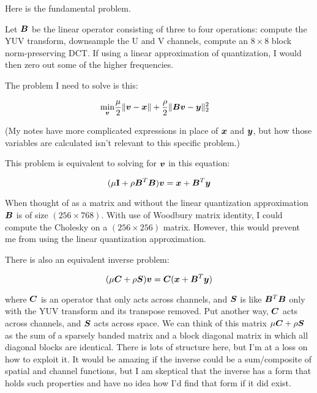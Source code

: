 \documentclass{article}
\begin{document}
Here is the fundamental problem.

Let $\bm{B}$ be the linear operator consisting of three to four operations: compute the YUV transform, downsample the U and V channels, compute an $8 \times 8$ block norm-preserving DCT.  If using a linear approximation of quantization, I would then zero out some of the higher frequencies.


The problem I need to solve is this:

\begin{equation}
\begin{aligned}
\min_{\bm{v}} & \frac{\mu}{2} \|\bm{v} - \bm{x}\| + \frac{\rho}{2}\|\bm{B}\bm{v} - \bm{y}\|_2^2
\end{aligned}
\end{equation}

(My notes have more complicated expressions in place of $\bm{x}$ and $\bm{y}$, but how those variables are calculated isn't relevant to this specific problem.)

This problem is equivalent to solving for $\bm{v}$ in this equation:

\begin{equation}
(\mu{\bf I} + \rho\bm{B}^T\bm{B})\bm{v} = \bm{x} + \bm{B}^T\bm{y}
\end{equation}

When thought of as a matrix and without the linear quantization approximation  $\bm{B}$ is of size $(256 \times 768)$. With use of Woodbury matrix identity, I could compute the Cholesky on a $(256 \times 256)$ matrix. However, this would prevent me from using the linear quantization approximation.

There is also an equivalent inverse problem:

\begin{equation}
(\mu\bm{C} + \rho\bm{S})\bm{v} = \bm{C}(\bm{x} + \bm{B}^T\bm{y})
\end{equation}

where $\bm{C}$ is an operator that only acts across channels, and $\bm{S}$ is like $\bm{B}^T\bm{B}$ only with the YUV transform and its transpose removed.  Put another way, $\bm{C}$ acts across channels, and $\bm{S}$ acts across space. We can think of this matrix $\mu\bm{C} + \rho\bm{S}$ as the sum of a sparsely banded matrix and a block diagonal matrix in which all diagonal blocks are identical. There is lots of structure here, but I'm at a loss on how to exploit it.  It would be amazing if the inverse could be a sum/composite of spatial and channel functions, but I am skeptical that the inverse has a form that holds such properties and have no idea how I'd find that form if it did exist.
\end{document}
